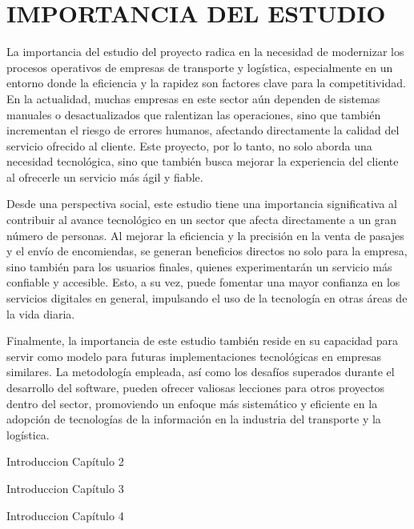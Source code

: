 \section{IMPORTANCIA DEL ESTUDIO}

	La importancia del estudio del proyecto radica en la necesidad de modernizar los procesos operativos de empresas de transporte y logística, especialmente en un entorno donde la eficiencia y la rapidez son factores clave para la competitividad. En la actualidad, muchas empresas en este sector aún dependen de sistemas manuales o desactualizados que ralentizan las operaciones, sino que también incrementan el riesgo de errores humanos, afectando directamente la calidad del servicio ofrecido al cliente. Este proyecto, por lo tanto, no solo aborda una necesidad tecnológica, sino que también busca mejorar la experiencia del cliente al ofrecerle un servicio más ágil y fiable.
	
	Desde una perspectiva social, este estudio tiene una importancia significativa al contribuir al avance tecnológico en un sector que afecta directamente a un gran número de personas. Al mejorar la eficiencia y la precisión en la venta de pasajes y el envío de encomiendas, se generan beneficios directos no solo para la empresa, sino también para los usuarios finales, quienes experimentarán un servicio más confiable y accesible. Esto, a su vez, puede fomentar una mayor confianza en los servicios digitales en general, impulsando el uso de la tecnología en otras áreas de la vida diaria.
	
	Finalmente, la importancia de este estudio también reside en su capacidad para servir como modelo para futuras implementaciones tecnológicas en empresas similares. La metodología empleada, así como los desafíos superados durante el desarrollo del software, pueden ofrecer valiosas lecciones para otros proyectos dentro del sector, promoviendo un enfoque más sistemático y eficiente en la adopción de tecnologías de la información en la industria del transporte y la logística.
	
	Introduccion Capítulo 2
	
	Introduccion Capítulo 3
	
	Introduccion Capítulo 4
	